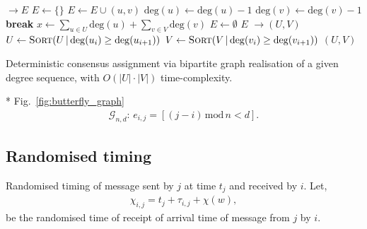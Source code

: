 \begin{algorithm}[H]
	\begin{algorithmic}
		 $\to E$
		\State $E \gets \{\}$ 
		 
		\State $E \gets E \cup (u,v)$ 
		\State $\mathrm{deg}(u) \gets \mathrm{deg}(u)-1$ 
		\State $\mathrm{deg}(v) \gets \mathrm{deg}(v)-1$
		\State \textbf{break}
		\EndIf
		\EndIf
		\EndFor
		\EndIf
		\EndFor
		\State $x \gets \sum_{u\in U} \mathrm{deg}(u) + \sum_{v\in V} \mathrm{deg}(v)$ 
		\State $E \gets \emptyset$ 
		\EndIf
		\State \Return $E$
		\EndFunction
		\State
		 $\to (U,V)$
		\State $U \gets \textsc{Sort}(U \,|\, \mathrm{deg}(u_i)\geq\mathrm{deg}(u_{i+1}))$ 
		\State $V \gets \textsc{Sort}(V \,|\, \mathrm{deg}(v_i)\geq\mathrm{deg}(v_{i+1}))$ 
		\State \Return $(U,V)$
		\EndFunction
	\end{algorithmic}
	\caption{\cite{Havel1955, Hakimi62} Deterministic consensus assignment via bipartite graph realisation of a given degree sequence, with \mbox{$O(|U|\cdot |V|)$} time-complexity.} \label{alg:initial_assignment}
\end{algorithm}

* Fig.~\ref{fig:butterfly_graph}
\begin{align}
	\mathcal{G}_{n,d}:\, e_{i,j} = [(j-i)\,\mathrm{mod}\, n < d].
\end{align}

\subsection{Randomised timing}

Randomised timing of message sent by $j$ at time $t_j$ and received by $i$. Let,
\begin{align}
	\chi_{i,j} = t_j+\tau_{i,j}+\chi(w),
\end{align}
be the randomised time of receipt of arrival time of message from $j$ by $i$.

